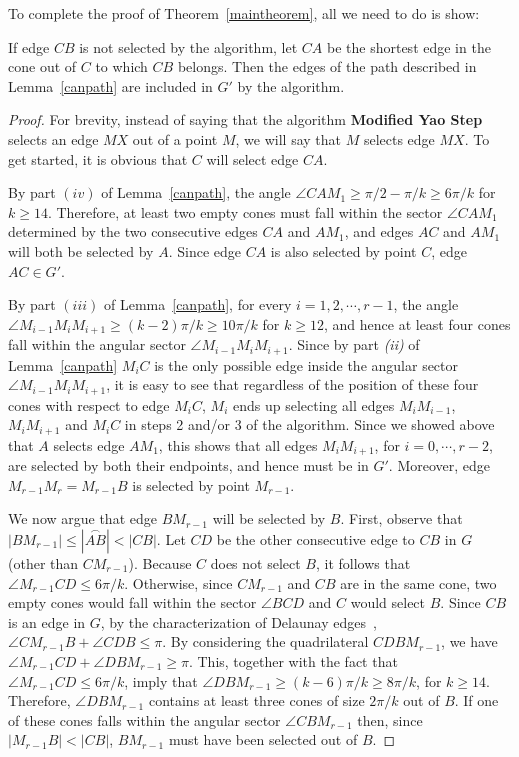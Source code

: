 \documentclass{stacs_proc}
\theoremstyle{plain}\newtheorem{satz}[thm]{Satz}
\begin{document}
To complete the proof of Theorem~\ref{maintheorem}, all we need to do is show:
\begin{lemma}
\label{edgeselected}
If edge $CB$ is not selected by the algorithm, let $CA$ be the shortest edge in
the cone out of $C$ to which $CB$ belongs. Then the edges of the path
described in Lemma~\ref{canpath} are included in $G'$  by the algorithm.
\begin{proof}
For brevity, instead of saying that the algorithm {\bf Modified Yao
Step} selects an edge $MX$ out of a point $M$, we will say that $M$
selects edge $MX$. To get started, it is obvious that $C$ will select edge
$CA$.

By part $(iv)$ of Lemma~\ref{canpath}, the angle $\angle{CAM_1} \geq
\pi/ 2 - \pi/k \geq 6 \pi/k$ for $k \geq 14$. Therefore, at least
two empty cones must fall within the sector $\angle{CAM_1}$
determined by the two consecutive edges $CA$ and $AM_1$, and edges
$AC$ and $AM_1$ will both be selected by $A$. Since edge $CA$ is
also selected by point $C$, edge $AC \in G'$.

By part $(iii)$ of Lemma~\ref{canpath}, for every $i = 1, 2, \cdots,
r-1$, the angle $\angle{M_{i-1}M_iM_{i+1}} \geq (k-2)\pi/k \geq
10\pi/k$ for $k\geq 12$, and hence at least four cones fall within
the angular sector $\angle{M_{i-1}M_iM_{i+1}}$. Since by part {\em
(ii)} of Lemma~\ref{canpath} $M_iC$ is the only possible edge inside
the angular sector $\angle{M_{i-1}M_iM_{i+1}}$, it is easy to see
that regardless of the position of these four cones with respect to
edge $M_iC$, $M_i$ ends up selecting all edges $M_iM_{i-1}$,
$M_iM_{i+1}$ and $M_iC$ in steps 2 and/or 3 of the algorithm. Since
we showed above that $A$ selects edge $AM_1$, this shows that all
edges $M_iM_{i+1}$, for $i=0, \cdots, r-2$, are selected by both
their endpoints, and hence must be in $G'$. Moreover, edge
$M_{r-1}M_r=M_{r-1}B$ is selected by point $M_{r-1}$.

We now argue that edge $BM_{r-1}$ will be selected by $B$. First, observe
that $|BM_{r-1}| \leq |\stackrel{\frown}{AB}| < |CB|$. 
Let $CD$ be the other consecutive edge to $CB$ in $G$ (other than
$CM_{r-1}$). Because $C$ does not select $B$, it follows that
$\angle{M_{r-1}CD} \leq 6 \pi/k$. Otherwise, since $CM_{r-1}$ and
$CB$ are in the same cone, two empty cones would fall within the
sector $\angle{BCD}$ and $C$ would select $B$. Since $CB$ is an edge
in $G$, by the characterization of Delaunay edges~\cite{book},
$\angle{CM_{r-1}B} + \angle{CDB} \leq \pi$. By considering the
quadrilateral $CDBM_{r-1}$, we have $\angle{M_{r-1}CD} +
\angle{DBM_{r-1}} \geq \pi$. This, together with the fact that
$\angle{M_{r-1}CD} \leq 6 \pi/k$, imply that $\angle{DBM_{r-1}} \geq
(k-6)\pi/k \geq 8 \pi/k$, for $k\geq 14$. Therefore,
$\angle{DBM_{r-1}}$ contains at least three cones of size $2\pi/k$
out of $B$. If one of these cones falls within the angular sector
$\angle{CBM_{r-1}}$ then, since $|M_{r-1}B| < |CB|$, $BM_{r-1}$ must
have been selected out of $B$.


\end{proof}
\end{lemma}
\end{document}
